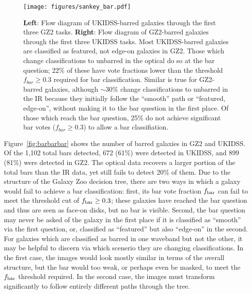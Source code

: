 \begin{figure}
\centering
\texttt{[image: figures/sankey\_bar.pdf]}
\caption{\textbf{Left}: Flow diagram of UKIDSS-barred galaxies through the first three GZ2 tasks. \textbf{Right}: Flow diagram of GZ2-barred galaxies through the first three UKIDSS tasks. Most UKIDSS-barred galaxies are classified as featured, not edge-on galaxies in GZ2. Those which change classifications to unbarred in the optical do so at the bar question; 22\% of these have vote fractions lower than the threshold $f_{bar}\ge0.3$ required for bar classification.  Similar is true for GZ2-barred galaxies, although $\sim30\%$ change classifications to unbarred in the IR because they initially follow the ``smooth'' path or ``featured, edge-on'', without making it to the bar question in the first place. Of those which reach the bar question, 25\% do not achieve significant bar votes ($f_{bar}\ge0.3$) to allow a bar classifiation.  }
\label{fig:sankeybar}
\end{figure}

Figure~\ref{fig:barbarbar} shows the number of barred galaxies in GZ2 and UKIDSS. Of the 1,102 total bars detected, 672 (61\%) were detected in UKIDSS, and 899 (81\%) were detected in GZ2. The optical data recovers a larger portion of the total bars than the IR data, yet still fails to detect 20\% of them. Due to the structure of the Galaxy Zoo decision tree, there are two ways in which a galaxy would fail to achieve a bar classification: first, its bar vote fraction $f_{\rm bar}$ can fail to meet the threshold cut of $f_{\rm bar}\ge0.3$; these galaxies have reached the bar question and thus are seen as face-on disks, but no bar is visible. Second, the bar question may never be asked of the galaxy in the first place if it is classified as ``smooth'' via the first question, or, classified as ``featured'' but also ``edge-on'' in the second. For galaxies which are classified as barred in one waveband but not the other, it may be helpful to discern via which scenerio they are changing classifications. In the first case, the images would look mostly similar in terms of the overall structure, but the bar would too weak, or perhaps even be masked, to meet the $f_{\rm bar}$ threshold required. In the second case, the images must transform significantly to follow entirely different paths through the tree. 

